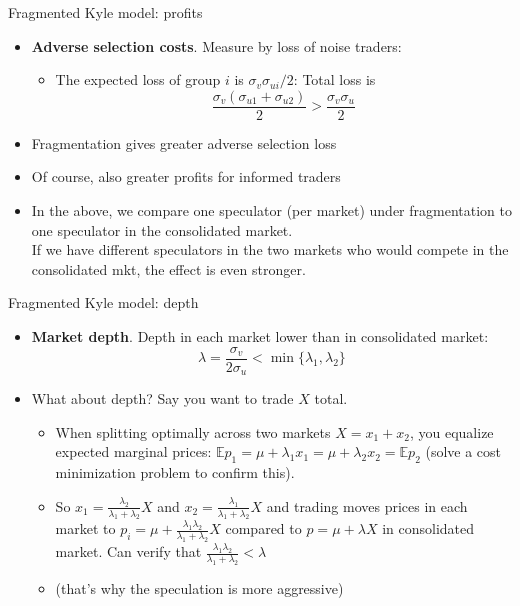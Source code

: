 \documentclass[english,10pt
,aspectratio=169
]{beamer}
\begin{document}
\begin{frame}{Fragmented Kyle model: profits}
	\begin{itemize}
		\item \textbf{Adverse selection costs}. Measure by loss of noise traders:
		\begin{itemize}
			\item The expected loss of group $i$ is $\sigma_{v} \sigma_{ui}/2$: Total loss is 
			\[
			\frac{\sigma_{v}(\sigma_{u1}+\sigma_{u2})}{2} > \frac{\sigma_{v} \sigma_{u}}{2}
			\]
		\end{itemize}
		
		\item \alert{Fragmentation gives greater adverse selection loss}
		
		\item Of course, also greater profits for informed traders
		
		\item In the above, we compare one speculator (per market) under fragmentation to one speculator in the consolidated market. \\
		If we have different speculators in the two markets who would compete in the consolidated mkt, the effect is even stronger.
	\end{itemize}
\end{frame}


\begin{frame}{Fragmented Kyle model: depth}
	\begin{itemize}
		\item \textbf{Market depth}. \alert{Depth in each market lower than in consolidated market}:
		\[
		\lambda = \frac{\sigma_v}{2 \sigma_u} < \min \{ \lambda_1, \lambda_2 \}
		\]
		
		\pause
		\item What about  depth? Say you want to trade $X$ total.
		\begin{itemize}
			\item When splitting optimally across two markets $X=x_1+x_2$, you equalize expected marginal prices: $\mathbb{E} p_1 = \mu + \lambda_1 x_1 = \mu + \lambda_2 x_2 = \mathbb{E} p_2$ (solve a cost minimization problem to confirm this).
			\item So $x_1 = \frac{\lambda_2}{\lambda_1+\lambda_2} X$ and $x_2 = \frac{\lambda_1}{\lambda_1+\lambda_2} X$ and trading moves prices in each market to $p_i = \mu + \frac{\lambda_1 \lambda_2}{\lambda_1 + \lambda_2} X$ compared to $p = \mu + \lambda X$ in consolidated market. Can verify that $\frac{\lambda_1 \lambda_2}{\lambda_1 + \lambda_2} < \lambda$
			\item {} (that's why the speculation is more aggressive)
		\end{itemize}
	\end{itemize}
\end{frame}
\end{document}
